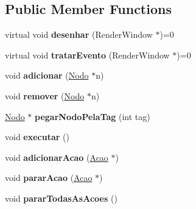 \subsection*{Public Member Functions}
\begin{DoxyCompactItemize}
\item 
\hypertarget{class_edda_1_1_nodo_aedc6c999c03cc00e41beddec7c93dac3}{
virtual void {\bfseries desenhar} (RenderWindow $\ast$)=0}
\label{class_edda_1_1_nodo_aedc6c999c03cc00e41beddec7c93dac3}

\item 
\hypertarget{class_edda_1_1_nodo_a0f24efb7a6f9be8e45b4ef2656c1e382}{
virtual void {\bfseries tratarEvento} (RenderWindow $\ast$)=0}
\label{class_edda_1_1_nodo_a0f24efb7a6f9be8e45b4ef2656c1e382}

\item 
\hypertarget{class_edda_1_1_nodo_a6c6ac09aa6ecb67c846ab6cb969d1c6d}{
void {\bfseries adicionar} (\hyperlink{class_edda_1_1_nodo}{Nodo} $\ast$n)}
\label{class_edda_1_1_nodo_a6c6ac09aa6ecb67c846ab6cb969d1c6d}

\item 
\hypertarget{class_edda_1_1_nodo_a9364a90f623ae04ba4752c1bef85ccdd}{
void {\bfseries remover} (\hyperlink{class_edda_1_1_nodo}{Nodo} $\ast$n)}
\label{class_edda_1_1_nodo_a9364a90f623ae04ba4752c1bef85ccdd}

\item 
\hypertarget{class_edda_1_1_nodo_a63d456d79bea395f8205261f364d7b90}{
\hyperlink{class_edda_1_1_nodo}{Nodo} $\ast$ {\bfseries pegarNodoPelaTag} (int tag)}
\label{class_edda_1_1_nodo_a63d456d79bea395f8205261f364d7b90}

\item 
\hypertarget{class_edda_1_1_nodo_a8b37a33842de487cabcefe72cd4dd483}{
void {\bfseries executar} ()}
\label{class_edda_1_1_nodo_a8b37a33842de487cabcefe72cd4dd483}

\item 
\hypertarget{class_edda_1_1_nodo_aecae42361dd3003dbae41b587161059b}{
void {\bfseries adicionarAcao} (\hyperlink{class_edda_1_1_acao}{Acao} $\ast$)}
\label{class_edda_1_1_nodo_aecae42361dd3003dbae41b587161059b}

\item 
\hypertarget{class_edda_1_1_nodo_a103bee6bcafc28294a1723423693cac4}{
void {\bfseries pararAcao} (\hyperlink{class_edda_1_1_acao}{Acao} $\ast$)}
\label{class_edda_1_1_nodo_a103bee6bcafc28294a1723423693cac4}

\item 
\hypertarget{class_edda_1_1_nodo_a6058d8141c5a29c0ffcbbae152c6721a}{
void {\bfseries pararTodasAsAcoes} ()}
\label{class_edda_1_1_nodo_a6058d8141c5a29c0ffcbbae152c6721a}


\end{DoxyCompactItemize}

